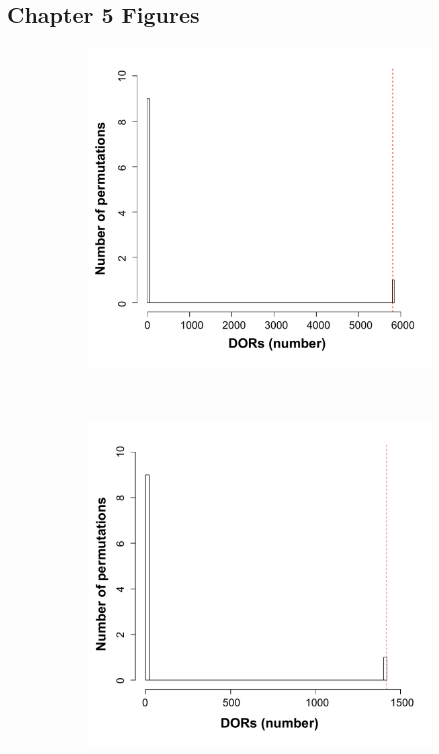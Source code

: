 \subsection{Chapter 5 Figures}

\bigskip
\begin{figure}[H]
\centering
\begin{subfigure}[b]{0.45\textwidth}
\centering 
\includegraphics[width=\textwidth]{./Appendix/pdfs/Chapter5/ATAC_PsA_CD14_permutation_analysis}
\caption{}
\end{subfigure}
~
\begin{subfigure}[b]{0.45\textwidth}
\centering 
\includegraphics[width=\textwidth]{./Appendix/pdfs/Chapter5/ATAC_PsA_CD4_permutation_analysis}

\end{subfigure}
\end{figure}
